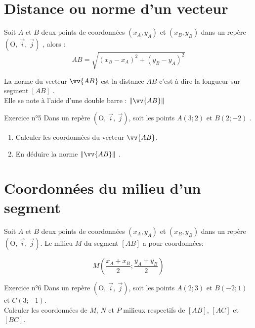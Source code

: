 \documentclass[12pt,a4paper]{article}
\def\Oij{$\left(\text{O},~\vec{i},~\vec{j}\right)$}
\begin{document}
\section{Distance ou norme d'un vecteur}

\begin{pro}
Soit $A$ et $B$ deux points de coordonnées $(x_A,y_A)$ et $(x_B,y_B)$ dans un repère \Oij{} , alors :
$$AB=\sqrt{(x_B-x_A)^2+(y_B-y_A)^2}$$

La norme du vecteur $\vv{AB}$ est la distance $AB$ c'est-à-dire la longueur sur segment $[AB]$ .\\
Elle se note à l'aide d'une double barre : $\norme{\vv{AB}}$ 
\end{pro}


\begin{mybox}{Exercice n°5}
Dans un repère \Oij{}, soit les points $A(3;2)$ et $B(2; -2)$ .

\begin{enumerate}
    \item Calculer les coordonnées du vecteur $\vv{AB}$.
    \item En déduire la norme $\norme{\vv{AB}}$ .
\end{enumerate}

\end{mybox}

\begin{framed}
\vspace{3cm}
\end{framed}


\section{Coordonnées du milieu d'un segment}


\begin{pro}
Soit $A$ et $B$ deux points de coordonnées $(x_A,y_A)$ et $(x_B,y_B)$ dans un repère \Oij{}.
Le milieu $M$ du segment $[AB]$ a pour coordonnées:

$$M\left(\dfrac{x_A+x_B}{2};\dfrac{y_A+y_B}{2}\right)$$
\end{pro}

\begin{mybox}{Exercice n°6}
Dans un repère \Oij{}, soit les points $A(2;3)$ et $B(-2; 1)$ et $C(3;-1)$.\\
Calculer les coordonnées de $M$, $N$ et $P$ milieux respectifs de $[AB]$, $[AC]$ et $[BC]$.
\end{mybox}

\begin{framed}
\vspace{3cm}
\end{framed}
\end{document}

